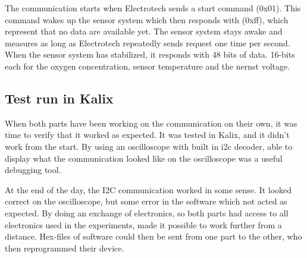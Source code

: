 The communication starts when Electrotech sends a start command (0x01). This command wakes up the sensor system which then responds with (0xff), which represent that no data are available yet. The sensor system stays awake and measures as long as Electrotech repeatedly sends request one time per second. When the sensor system has stabilized, it responds with 48 bits of data. 16-bits each for the oxygen concentration, sensor temperature and the nernst voltage.



\subsection{Test run in Kalix}

When both parts have been working on the communication on their own, it was time to verify that it worked as expected. It was tested in Kalix, and it didn't work from the start. By using an oscilloscope with built in \ac{i2c} decoder, able to display what the communication looked like on the oscilloscope was a useful debugging tool.

At the end of the day, the I2C communication worked in some sense. It looked correct on the oscilloscope, but some error in the software which not acted as expected. By doing an exchange of electronics, so both parts had access to all electronics used in the experiments, made it possible to work further from a distance. Hex-files of software could then be sent from one part to the other, who then reprogrammed their device.





